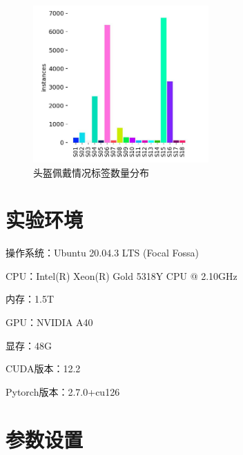\begin{figure}[!htb]
    \centering
    \includegraphics[width=0.6\textwidth]{figs/chap03/label1.png}
    \caption{头盔佩戴情况标签数量分布}
    \label{fig:label1}
\end{figure}




\section{实验环境}
操作系统：Ubuntu 20.04.3 LTS (Focal Fossa)

CPU：Intel(R) Xeon(R) Gold 5318Y CPU @ 2.10GHz

内存：1.5T

GPU：NVIDIA A40

显存：48G

CUDA版本：12.2

Pytorch版本：2.7.0+cu126

\section{参数设置}

